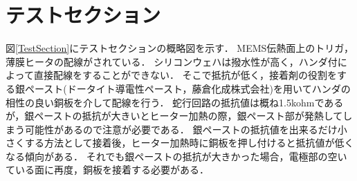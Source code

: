 %
%
%


\section{テストセクション}
図\ref{TestSection}にテストセクションの概略図を示す．
MEMS伝熱面上のトリガ，薄膜ヒータの配線がされている．
シリコンウェハは撥水性が高く，ハンダ付によって直接配線をすることができない．
そこで抵抗が低く，接着剤の役割をする銀ペースト(ドータイト導電性ペースト，藤倉化成株式会社)を用いてハンダの相性の良い銅板を介して配線を行う．
蛇行回路の抵抗値は概ね1.5kohmであるが，銀ペーストの抵抗が大きいとヒーター加熱の際，銀ペースト部が発熱してしまう可能性があるので注意が必要である．
銀ペーストの抵抗値を出来るだけ小さくする方法として接着後，ヒーター加熱時に銅板を押し付けると抵抗値が低くなる傾向がある．
それでも銀ペーストの抵抗が大きかった場合，電極部の空いている面に再度，銅板を接着する必要がある．

